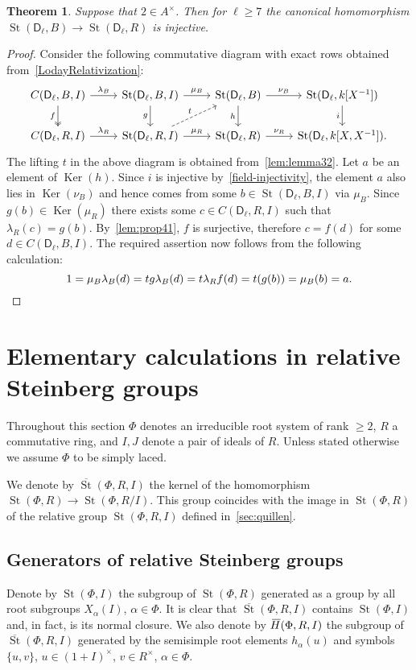 \documentclass[oneside, 8pt]{amsart}
\newtheorem{theorem}{Theorem}
\theoremstyle{remark}
\theoremstyle{definition}
\numberwithin{lemma}{section}
\numberwithin{prop}{section}
\numberwithin{corollary}{section}
\numberwithin{externaltheorem}{section}
\DeclareMathOperator{\Ker}{Ker}
\DeclareMathOperator{\St}{St}
\newcommand{\myol}[2][3]{{}\mkern#1mu\overline{\mkern-#1mu#2}}
\newcommand{\rD}{\mathsf{D}}
\numberwithin{equation}{section}
\begin{document}
\begin{theorem} \label{thm41} Suppose that $2 \in A^\times$. Then for $\ell \geq 7$ the canonical homomorphism $\St(\rD_\ell, B) \to \St(\rD_\ell, R)$ is injective. \end{theorem}
\begin{proof}
 Consider the following commutative diagram with exact rows obtained from~\eqref{LodayRelativization}:
\[\begin{tikzcd} C(\rD_\ell, B, I) \arrow{r}{\lambda_B} \arrow[d, swap, "f", twoheadrightarrow] & \St(\rD_\ell, B, I) \arrow{r}{\mu_B} \arrow{d}[swap]{g} & \St(\rD_\ell, B) \arrow{r}{\nu_B} \arrow{d}[swap]{h} & \St(\rD_\ell, k[X^{-1}]) \arrow{d}[swap]{i} \\ C(\rD_\ell, R, I) \arrow{r}{\lambda_R} & \St(\rD_\ell, R, I) \arrow{r}{\mu_R} \arrow[ur, "t", dashrightarrow] & \St(\rD_\ell, R) \arrow{r}{\nu_R} & \St(\rD_\ell, k[X, X^{-1}]).\end{tikzcd}\]
The lifting $t$ in the above diagram is obtained from~\cref{lem:lemma32}.
Let $a$ be an element of $\Ker(h)$. Since $i$ is injective by~\cref{field-injectivity}, the element $a$
 also lies in $\Ker(\nu_B)$ and hence comes from some $b \in \St(\rD_\ell, B, I)$ via $\mu_B$.
Since $g(b) \in \Ker(\mu_R)$ there exists some $c \in C(\rD_\ell, R, I)$ such that $\lambda_R(c) = g(b)$. 
By~\cref{lem:prop41}, $f$ is surjective, therefore $c = f(d)$ for some $d \in C(\rD_\ell, B, I)$.
The required assertion now follows from the following calculation:
 \[ 1 = \mu_B\lambda_B(d) = tg\lambda_B(d) = t\lambda_Rf(d) =t(g(b)) = \mu_B(b) = a. \qedhere \]
\end{proof}

\section{Elementary calculations in relative Steinberg groups}\label{sec:elementary}
Throughout this section $\Phi$ denotes an irreducible root system of rank $\geq 2$, $R$ a commutative ring, and $I, J$ denote a pair of ideals of $R$.
Unless stated otherwise we assume $\Phi$ to be simply laced.

We denote by $\overline{\St}(\Phi, R, I)$ the kernel of the homomorphism $\St(\Phi, R) \to \St(\Phi, R/I)$.
This group coincides with the image in $\St(\Phi, R)$ of the relative group $\St(\Phi, R, I)$ defined in~\cref{sec:quillen}.

\subsection{Generators of relative Steinberg groups}
Denote by $\St(\Phi, I)$ the subgroup of $\St(\Phi, R)$ generated as a group by all root subgroups $X_\alpha(I)$, $\alpha\in\Phi$.
It is clear that $\overline{\St}(\Phi, R, I)$ contains $\St(\Phi, I)$ and, in fact, is its normal closure.
We also denote by $\myol{H}(\Phi, R, I)$ the subgroup of $\overline{\St}(\Phi, R, I)$ generated by the semisimple root elements $h_\alpha(u)$ and symbols $\{u, v\}$, $u \in (1+I)^\times$, $v \in R^\times$, $\alpha\in \Phi$.
\end{document}
